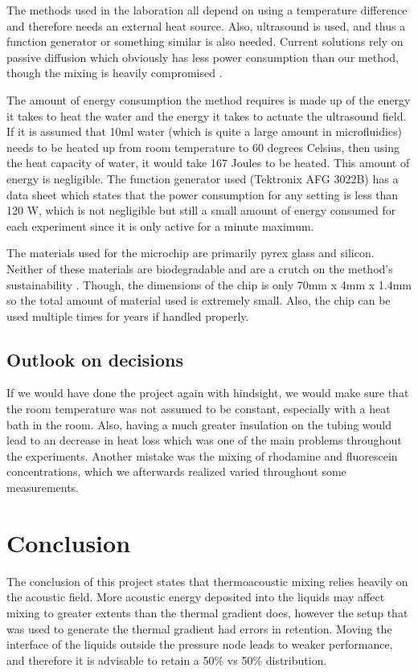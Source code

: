 \documentclass[twoside,twocolumn,9pt,a4paper]{IEEEtran}
\begin{document}
The methods used in the laboration all depend on using a temperature difference and therefore needs an external heat source. Also, ultrasound is used, and thus a function generator or something similar is also needed. Current solutions rely on passive diffusion which obviously has less power consumption than our method, though the mixing is heavily compromised \cite{Qiu}. 

The amount of energy consumption the method requires is made up of the energy it takes to heat the water and the energy it takes to actuate the ultrasound field. If it is assumed that 10ml  water (which is quite a large amount in microfluidics) needs to be heated up from room temperature to 60 degrees Celsius, then using the heat capacity of water, it would take 167 Joules to be heated. This amount of energy is negligible. The function generator used (Tektronix AFG 3022B) has a data sheet \cite{Datasheet} which states that the power consumption for any setting is less than 120 W, which is not negligible but still a small amount of energy consumed for each experiment since it is only active for a minute maximum.

The materials used for the microchip are primarily pyrex glass and silicon. Neither of these materials are biodegradable and are a crutch on the method’s sustainability \cite{Graiver, Adekomaya}. Though, the dimensions of the chip is only 70mm x 4mm x 1.4mm so the total amount of material used is extremely small. Also, the chip can be used multiple times for years if handled properly.

\subsection{Outlook on decisions}
If we would have done the project again with hindsight, we would make sure that the room temperature was not assumed to be constant, especially with a heat bath in the room. Also, having a much greater insulation on the tubing would lead to an decrease in heat loss which was one of the main problems throughout the experiments. Another mistake was the mixing of rhodamine and fluorescein concentrations, which we afterwards realized varied throughout some measurements. 





\section{Conclusion}
The conclusion of this project states that thermoacoustic mixing relies heavily on the acoustic field. More acoustic energy deposited into the liquids may affect mixing to greater extents than the thermal gradient does, however the setup that was used to generate the thermal gradient had errors in retention. Moving the interface of the liquids outside the pressure node leads to weaker performance, and therefore it is advisable to retain a 50\% vs 50\% distribution.
\end{document}
